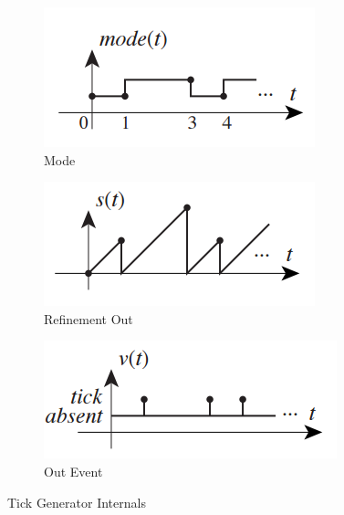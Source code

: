 \begin{figure}[!h]
  \centering
  \begin{subfigure}[b]{0.3\textwidth}
    \centering
    \includegraphics[width=\textwidth]{Figs/tickgenmode.PNG}
    \caption{Mode}
    \label{fig:tickgenmode}
  \end{subfigure}
  \begin{subfigure}[b]{0.3\textwidth}
    \centering
    \includegraphics[width=\textwidth]{Figs/tickgenstate.PNG}
    \caption{Refinement Out}
    \label{fig:tickgenstate}
  \end{subfigure}
  \begin{subfigure}[b]{0.3\textwidth}
    \centering
    \includegraphics[width=\textwidth]{Figs/tickgenout.PNG}
    \caption{Out Event}
    \label{fig:tickgenout}
  \end{subfigure}
  \caption{Tick Generator Internals}
\end{figure}

